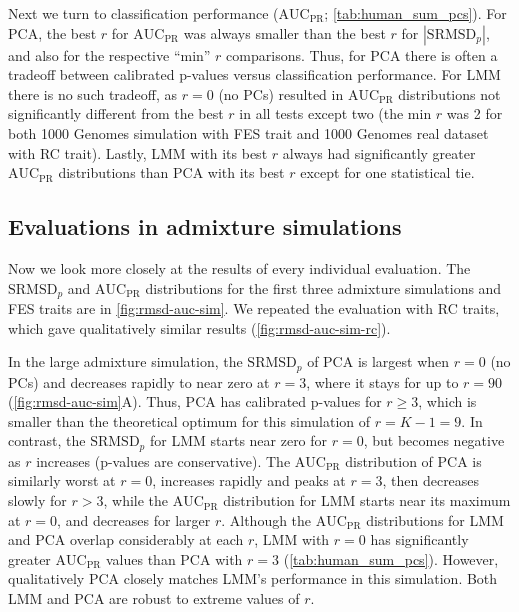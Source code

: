 \documentclass[11pt]{article}
\newcommand{\rmsd}{\text{SRMSD}_p}
\newcommand{\auc}{\text{AUC}_\text{PR}}
\begin{document}
Next we turn to classification performance ($\auc$; \cref{tab:human_sum_pcs}).
For PCA, the best $r$ for $\auc$ was always smaller than the best $r$ for $|\rmsd|$, and also for the respective ``min'' $r$ comparisons.
Thus, for PCA there is often a tradeoff between calibrated p-values versus classification performance.
For LMM there is no such tradeoff, as $r=0$ (no PCs) resulted in $\auc$ distributions not significantly different from the best $r$ in all tests except two (the min $r$ was 2 for both 1000 Genomes simulation with FES trait and 1000 Genomes real dataset with RC trait).
Lastly, LMM with its best $r$ always had significantly greater $\auc$ distributions than PCA with its best $r$ except for one statistical tie.

\subsection{Evaluations in admixture simulations}

Now we look more closely at the results of every individual evaluation.
The $\rmsd$ and $\auc$ distributions for the first three admixture simulations and FES traits are in \cref{fig:rmsd-auc-sim}.
We repeated the evaluation with RC traits, which gave qualitatively similar results (\cref{fig:rmsd-auc-sim-rc}).

In the large admixture simulation, the $\rmsd$ of PCA is largest when $r=0$ (no PCs) and decreases rapidly to near zero at $r=3$, where it stays for up to $r=90$ (\cref{fig:rmsd-auc-sim}A).
Thus, PCA has calibrated p-values for $r \ge 3$, which is smaller than the theoretical optimum for this simulation of $r = K - 1 = 9$.
In contrast, the $\rmsd$ for LMM starts near zero for $r=0$, but becomes negative as $r$ increases (p-values are conservative).
The $\auc$ distribution of PCA is similarly worst at $r=0$, increases rapidly and peaks at $r = 3$, then decreases slowly for $r > 3$, while the $\auc$ distribution for LMM starts near its maximum at $r=0$, and decreases for larger $r$.
Although the $\auc$ distributions for LMM and PCA overlap considerably at each $r$, LMM with $r=0$ has significantly greater $\auc$ values than PCA with $r=3$ (\cref{tab:human_sum_pcs}).
However, qualitatively PCA closely matches LMM's performance in this simulation.
Both LMM and PCA are robust to extreme values of $r$.
\end{document}
